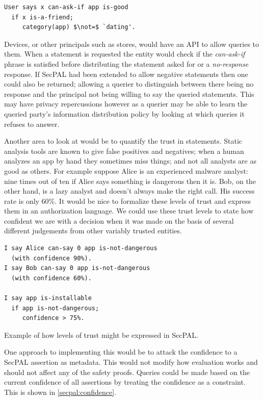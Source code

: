 \documentclass[a4paper,sfsidenotes]{%
  article%
}
\begin{document}
\begin{lstlisting}[language=SecPAL,mathescape=true]
User says x can-ask-if app is-good
  if x is-a-friend;
     category(app) $\not=$ `dating'.
\end{lstlisting}

Devices, or other principals such as stores, would have an API to allow queries
to them. When a statement is requested the entity would check if
the \emph{can-ask-if} phrase is satisfied before distributing the statement
asked for or a \emph{no-response} response.  If SecPAL had been extended
to allow negative statements then one could also be returned; allowing a querier
to distinguish between there being no response and the principal not being
willing to say the queried statements.  This may have privacy repercussions
however as a querier may be able to learn the queried party's information
distribution policy by looking at which queries it refuses to answer.  

Another area to look at would be to quantify the trust in statements. Static
analysis tools are known to give false positives and negatives; when a human
analyzes an app by hand they sometimes miss things; and not all analysts are as
good as others.  For example suppose Alice is an experienced malware analyst:
nine times out of ten if Alice says something is dangerous then it is.  Bob, on
the other hand, is a lazy analyst and doesn't always make the right call.  His
success rate is only 60\%.  It would be nice to formalize these levels of trust
and express them in an authorization language. We could use these trust levels
to state how confident we are with a decision when it was made on the basis of
several different judgements from other variably trusted entities.

\begin{marginfigure}
  \begin{lstlisting}[language=SecPAL]
I say Alice can-say 0 app is-not-dangerous 
  (with confidence 90%).
I say Bob can-say 0 app is-not-dangerous
  (with confidence 60%).

I say app is-installable 
  if app is-not-dangerous;
     confidence > 75%.
  \end{lstlisting}
  \caption{Example of how levels of trust might be expressed in SecPAL.}
  \label{secpal:confidence}
\end{marginfigure}

One approach to implementing this would be to attack the confidence to a SecPAL
assertion as metadata.  This would not modify how evaluation works
and should not affect any of the safety proofs.  Queries could be made based on
the current confidence of all assertions by treating the confidence as a
constraint.  This is shown in \autoref{secpal:confidence}.
\end{document}
